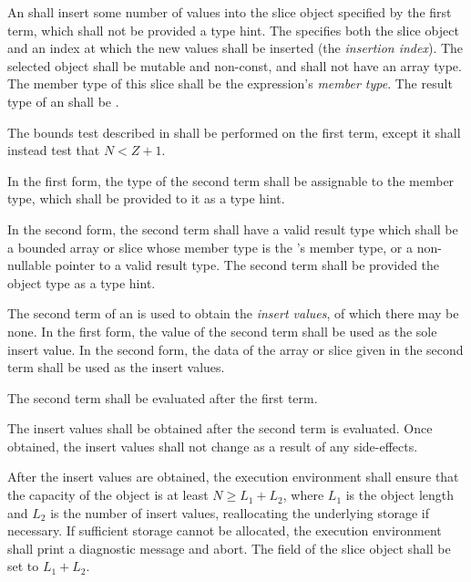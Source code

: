 
\specsubsubitem
An  shall insert some number of values into the
slice object specified by the first term, which shall not be provided a type
hint. The  specifies both the slice object and
an index at which the new values shall be inserted (the \textit{insertion
index}). The selected object shall be mutable and non-const, and shall not have
an array type. The member type of this slice shall be the expression's
\textit{member type}. The result type of an 
shall be .

\specsubsubitem
The bounds test described in  shall be performed on the
first term, except it shall instead test that $N < Z+1$.

\specsubsubitem
In the first form, the type of the second term shall be assignable to the member
type, which shall be provided to it as a type hint.

\specsubsubitem
In the second form, the second term shall have a valid result type which
shall be a bounded array or slice whose member type is the
's member type, or a non-nullable pointer to a
valid result type. The second term shall be provided the object type as a type
hint.

\specsubsubitem
The second term of an  is used to obtain the
\textit{insert values}, of which there may be none. In the first form, the
value of the second term shall be used as the sole insert value. In the second
form, the data of the array or slice given in the second term shall be used as
the insert values.

\specsubsubitem
The second term shall be evaluated after the first term.

\specsubsubitem
The insert values shall be obtained after the second term is evaluated. Once
obtained, the insert values shall not change as a result of any side-effects.

\specsubsubitem
After the insert values are obtained, the execution environment shall ensure
that the capacity of the object is at least $N \geq L_1 + L_2$, where $L_1$ is
the object length and $L_2$ is the number of insert values, reallocating the
underlying storage if necessary. If sufficient storage cannot be allocated, the
execution environment shall print a diagnostic message and abort. The
 field of the slice object shall be set to $L_1 + L_2$.


